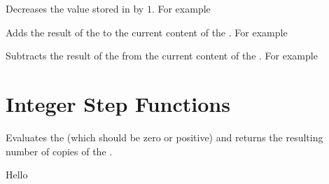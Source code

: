 \documentclass[oneside]{book}
\begin{document}
\begin{function}{\intDecr}
\begin{syntax}
 
\end{syntax}
Decreases the value stored in  by $1$.
For example
\begin{demohigh}
\intSet {}
\intDecr \lTmpaInt
\intUse \lTmpaInt
\end{demohigh}
\end{function}

\begin{function}{\intAdd}
\begin{syntax}
  
\end{syntax}
Adds the result of the  to the current
content of the . For example
\begin{demohigh}
\intSet {}
\intAdd {}
\intUse \lTmpaInt
\end{demohigh}
\end{function}

\begin{function}{\intSub}
\begin{syntax}
  
\end{syntax}
Subtracts the result of the  from the
current content of the . For example
\begin{demohigh}
\intSet {}
\intSub {}
\intUse \lTmpaInt
\end{demohigh}
\end{function}

\section{Integer Step Functions}

\begin{function}{\intReplicate}
\begin{syntax}
  
\end{syntax}
Evaluates the  (which should be zero or positive)
and returns the resulting number of copies of the .
\begin{demohigh}
 {Hello}
\end{demohigh}
\end{function}
\end{document}
